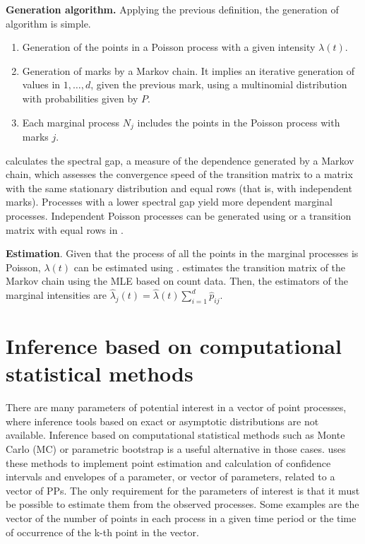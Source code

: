\textbf{ Generation algorithm.}  Applying the previous definition,  the  generation of algorithm is simple.

\begin{enumerate}
	\item Generation of the points in a  Poisson process  with a given intensity $\lambda(t)$. 
	\item Generation of marks  by a Markov chain.  It implies an iterative  generation of  values in $1, \ldots, d$, given the previous mark, using a multinomial distribution  with  probabilities given by $P$.
	\item Each marginal process $N_j$ includes the  points in the  Poisson process with marks  $j$.
\end{enumerate}



 calculates the spectral gap, a measure of the dependence generated  by a Markov chain, which  assesses the convergence speed of the transition matrix  to  a matrix with the same stationary distribution and equal rows (that is, with independent marks).  Processes with a lower spectral gap   yield more dependent  marginal processes. Independent Poisson processes  can be generated using  or  a transition matrix with equal rows in .  

\textbf{Estimation}.  Given that the process of all the points in the marginal processes is  Poisson,    $\lambda(t)$ can   be estimated  using .    estimates the transition matrix of the Markov chain using the MLE based on count data.  %
Then, the  estimators of the marginal intensities  are  $\hat \lambda_j(t)=\hat \lambda(t) \sum_{i=1}^d \hat p_{ij}$.






\section{Inference based on computational statistical methods
\label{SecInfSim}}


There are many parameters of  potential interest  in a vector of point processes,  where  inference tools based on exact or asymptotic  distributions   are not available. Inference based on  computational statistical  methods such as Monte Carlo (MC)  or parametric bootstrap  is a useful alternative in those cases.     uses these methods to  implement   point estimation and  calculation of confidence intervals and envelopes of a  parameter, or  vector of parameters, related to a vector of PPs. The only requirement  for the parameters of interest is that it must be possible to estimate them from  the observed processes. Some examples  are the vector of the  number of points  in each process in a given time period or  the  time of  occurrence of the  k-th point in   the vector.  

